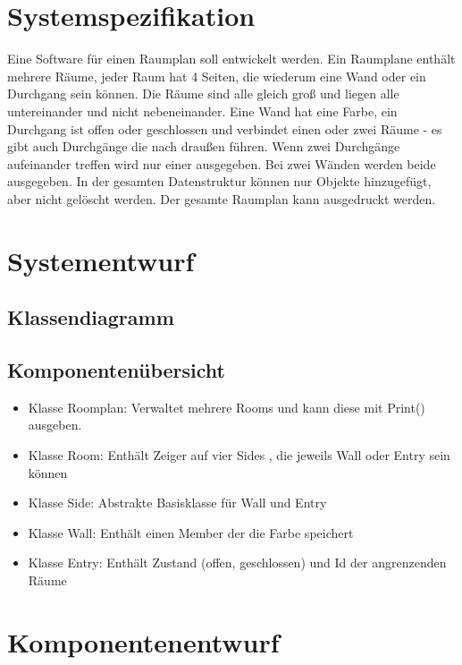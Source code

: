 \documentclass[12pt,a4paper]{article}
\begin{document}
\section{Systemspezifikation}
Eine Software für einen Raumplan soll entwickelt werden. Ein Raumplane enthält mehrere Räume, jeder Raum hat 4 Seiten, die wiederum eine Wand oder ein Durchgang sein können. Die Räume sind alle gleich groß und liegen alle untereinander und nicht nebeneinander. Eine Wand hat eine Farbe, ein Durchgang ist offen oder geschlossen und verbindet einen oder zwei Räume - es gibt auch Durchgänge die nach draußen führen. Wenn zwei Durchgänge aufeinander treffen wird nur einer ausgegeben. Bei zwei Wänden werden beide ausgegeben. In der gesamten Datenstruktur können nur Objekte hinzugefügt, aber nicht gelöscht werden. Der gesamte Raumplan kann ausgedruckt werden. \\


\newpage
\section {Systementwurf}
\subsection {Klassendiagramm}
\subsection {Komponentenübersicht}
\begin {itemize} 
	\item Klasse Roomplan:
	Verwaltet mehrere Rooms und kann diese mit Print() ausgeben.
	\item Klasse Room:
	Enthält Zeiger auf vier Sides , die jeweils Wall oder Entry sein können
	\item Klasse Side:
	Abstrakte Basisklasse für Wall und Entry
	\item Klasse Wall: 
	Enthält einen Member der die Farbe speichert
	\item Klasse Entry: 
	Enthält Zustand (offen, geschlossen) und Id der angrenzenden Räume

\end {itemize}

\newpage
\section {Komponentenentwurf}
\end{document}
